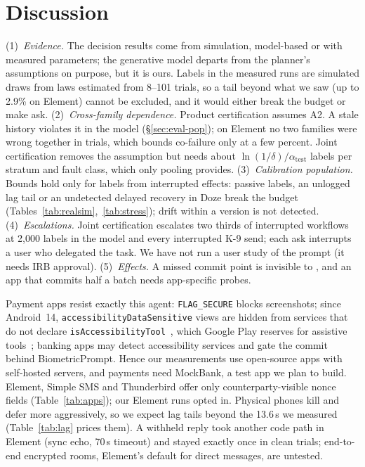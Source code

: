 \section{Discussion}
\label{sec:discussion}

(1)~\emph{Evidence.} The decision results come from simulation, model-based or with measured parameters; the generative model departs from the planner's assumptions on purpose,
but it is ours. \RealDataLimitation{} Labels in the measured runs are simulated draws from laws estimated from 8--101 trials, so a tail beyond what we saw (up to 2.9\% on
Element) cannot be excluded, and it would either break the budget or make \sys ask.
(2)~\emph{Cross-family dependence.} Product certification assumes A2. A stale history violates it in the model (\S\ref{sec:eval-pop}); on Element no two families were wrong
together in \RealCoN{} trials, which bounds co-failure only at a few percent. Joint certification removes the assumption but needs about $\ln(1/\delta)/\alpha_{\mathrm{test}}$ labels
per stratum and fault class, which only pooling provides.
(3)~\emph{Calibration population.} Bounds hold only for labels from interrupted effects: passive labels, an unlogged lag tail or an undetected delayed recovery in Doze break the
budget (Tables~\ref{tab:realsim},~\ref{tab:stress}); drift within a version is not detected.
(4)~\emph{Escalations.} Joint certification escalates two thirds of interrupted workflows at 2{,}000 labels in the model and every interrupted K-9 send; each ask interrupts a
user who delegated the task. We have not run a user study of the prompt (it needs IRB approval).
(5)~\emph{Effects.} A missed commit point is invisible to \sys, and an app that commits half a batch needs app-specific probes.

Payment apps resist exactly this agent: \texttt{FLAG\_SECURE} blocks screenshots; since Android~14, \texttt{accessibility\-Data\-Sensitive} views are hidden from services that do
not declare \texttt{isAccessibilityTool}~\cite{android_a11ysensitive}, which Google Play reserves for assistive tools~\cite{googleplay_a11ypolicy}; banking apps may detect
accessibility services and gate the commit behind BiometricPrompt. Hence our measurements use open-source apps with self-hosted servers, and payments need MockBank, a test app we
plan to build. Element, Simple SMS and Thunderbird offer only counterparty-visible nonce fields (Table~\ref{tab:apps}); our Element runs opted in. Physical phones kill and defer
more aggressively, so we expect lag tails beyond the 13.6\,s we measured (Table~\ref{tab:lag} prices them). A withheld reply took another code path in Element (sync echo, 70\,s
timeout) and stayed exactly once in \RealTimeoutClean{} clean trials; end-to-end encrypted rooms, Element's default for direct messages, are untested.

